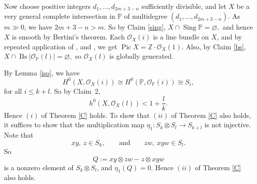 \documentclass[11pt,letterpaper]{amsart}
\begin{document}
Now choose positive integers $d_1,\ldots,d_{2m+3-n}$ sufficiently divisible, and let
$X$ be a very general complete intersection in $\mathbb{P}$ of multidegree
$(d_1,\ldots,d_{2m+3-n})$. As $m\gg0$, we have $2m+3-n>m$. So by Claim \ref{sing}, $X\cap \operatorname{Sing}\mathbb{P}=\varnothing,$
and hence $X$ is smooth by Bertini's theorem. Each $\mathcal{O}_X(i)$ is a line
bundle on $X$, and by repeated application of
\cite[Theorem 1]{ravindra2005grothendieck}, and
\cite[Theorem 1]{ravindra2009noether}, we get $\operatorname{Pic}X=\mathbb{Z}\cdot\mathcal{O}_X(1).$
Also, by Claim \ref{bs}, $X\cap \operatorname{Bs}|\mathcal{O}_{\mathbb{P}}(l)|=\varnothing,$
so $\mathcal{O}_X(l)$ is globally generated.

By Lemma \ref{iso}, we have
\[
H^0(X,\mathcal{O}_X(i))
\cong
H^0(\mathbb{P},\mathcal{O}_{\mathbb{P}}(i))
\cong
S_i,
\]
for all $i\le k+l$. So by Claim~2,
\[
h^0(X,\mathcal{O}_X(l))
<
1+\frac{l}{k}.
\]
Hence $(i)$ of Theorem \ref{C} holds. To show that $(ii)$ of Theorem \ref{C} also holds, it suffices to show that the
multiplication map $\eta_1:S_k\otimes S_l\longrightarrow S_{k+l}$
is not injective. Note that
\[
xy,\ z\in S_k,
\qquad\text{and}\qquad
zw,\ xyw\in S_l.
\]
So
\[
Q:=xy\otimes zw-z\otimes xyw
\]
is a nonzero element of $S_k\otimes S_l$, and $\eta_1(Q)=0.$
Hence $(ii)$ of Theorem \ref{C} also holds.
\end{document}

